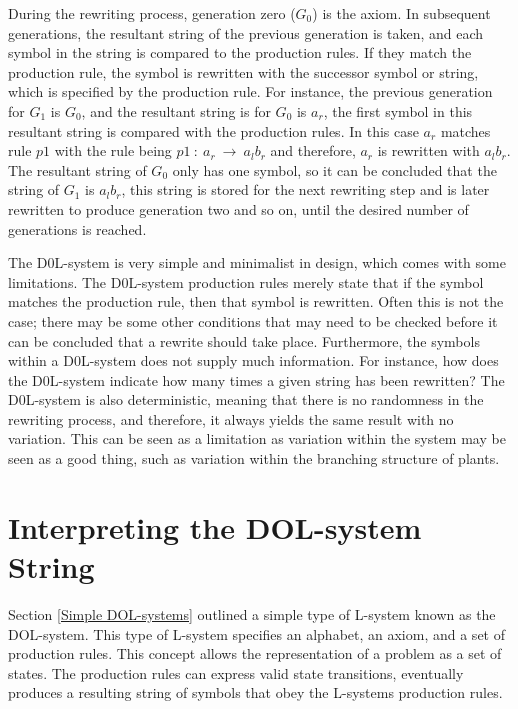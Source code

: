 \noindent
During the rewriting process, generation zero ($G_0$) is the axiom. In subsequent generations, the resultant string of the previous generation is taken, and each symbol in the string is compared to the production rules. If they match the production rule, the symbol is rewritten with the successor symbol or string, which is specified by the production rule. For instance, the previous generation for $G_1$ is $G_0$, and the resultant string is for $G_0$ is $a_r$, the first symbol in this resultant string is compared with the production rules. In this case $a_r$ matches rule $p1$ with the rule being $p1~ :~ a_r~ \rightarrow~ a_l b_r$ and therefore, $a_r$ is rewritten with $a_l b_r$. The resultant string of $G_0$ only has one symbol, so it can be concluded that the string of $G_1$ is $a_l b_r$, this string is stored for the next rewriting step and is later rewritten to produce generation two and so on, until the desired number of generations is reached.

The D0L-system is very simple and minimalist in design, which comes with some limitations. The D0L-system production rules merely state that if the symbol matches the production rule, then that symbol is rewritten. Often this is not the case; there may be some other conditions that may need to be checked before it can be concluded that a rewrite should take place. Furthermore, the symbols within a D0L-system does not supply much information. For instance, how does the D0L-system indicate how many times a given string has been rewritten? The D0L-system is also deterministic, meaning that there is no randomness in the rewriting process, and therefore, it always yields the same result with no variation. This can be seen as a limitation as variation within the system may be seen as a good thing, such as variation within the branching structure of plants. 

\section{Interpreting the DOL-system String} \label{Interpreting DOL-system}

Section \ref{Simple DOL-systems} outlined a simple type of L-system known as the DOL-system. This type of L-system specifies an alphabet, an axiom, and a set of production rules. This concept allows the representation of a problem as a set of states. The production rules can express valid state transitions, eventually produces a resulting string of symbols that obey the L-systems production rules. 

